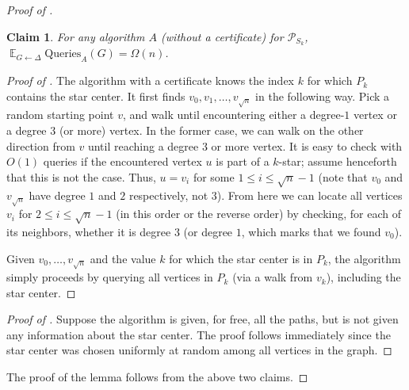 \documentclass[11pt]{article}
\numberwithin{equation}{section}
\newtheorem{claim}[claim]{Claim}
\newcommand\E{\mathop{\mathbb E}}
\newcommand{\Query}{\text{Queries}}
\renewcommand{\P}{\mathcal{P}}
\newcommand{\1}{\mathbf{1}}
\begin{document}
\begin{proof}[Proof of ]
\begin{claim} \label{claim:path:lowerbound}
For any algorithm $A$ (without a certificate) for $\P_{S_k}$, $\E_{G \leftarrow \Delta} \Query_A(G) = \Omega(n)$.
\end{claim}


\begin{proof}[Proof of ]
The algorithm with a certificate knows the index $k$ for which $P_k$ contains the star center. It first finds $v_0, v_1, \ldots, v_{\sqrt{n}}$ in the following way. Pick a random starting point $v$, and walk until encountering either a degree-$1$ vertex or a degree $3$ (or more) vertex. In the former case, we can walk on the other direction from $v$ until reaching a degree $3$ or more vertex. It is easy to check with $O(1)$ queries if the encountered vertex $u$ is part of a $k$-star; assume henceforth that this is not the case. Thus, $u = v_i$ for some $1 \leq i \leq \sqrt{n}-1$ (note that $v_0$ and $v_{\sqrt{n}}$ have degree $1$ and $2$ respectively, not $3$). From here we can locate all vertices $v_i$ for $2 \leq i \leq \sqrt{n}-1$ (in this order or the reverse order) by checking, for each of its neighbors, whether it is degree $3$ (or degree $1$, which marks that we found $v_0$).

Given $v_0, \ldots, v_{\sqrt{n}}$ and the value $k$ for which the star center is in $P_k$, the algorithm simply proceeds by querying all vertices in $P_k$ (via a walk from $v_k$), including the star center.
\end{proof}

\begin{proof}[Proof of ]
 Suppose the algorithm is given, for free, all the paths, but is not given any information about the star center. The proof follows immediately since the star center was chosen uniformly at random among all vertices in the graph.
\end{proof}
The proof of the lemma follows from the above two claims.
\end{proof}
\end{document}
